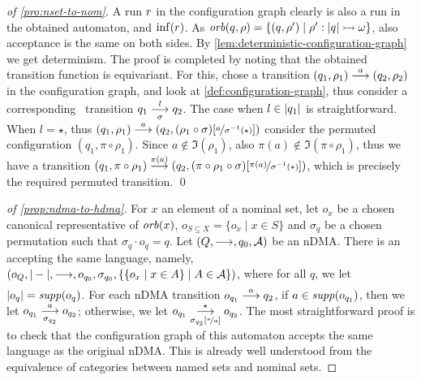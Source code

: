 \begin{proof}[of \cref{pro:nset-to-nom}]
 A run $r$ in the configuration graph clearly is also a run in the obtained automaton, and $\inf(r)$. As $\mathit{orb}(q,\rho) = \{(q,\rho')\mid \rho' : |q| \rightarrowtail \omega \}$, also acceptance is the same on both sides. By \cref{lem:deterministic-configuration-graph} we get determinism. The proof is completed by noting that the obtained transition function is equivariant. For this, chose a transition $(q_1,\rho_1) \overset{a}{\longrightarrow} (q_2,\rho_2)$ in the configuration graph, and look at \cref{def:configuration-graph}, thus consider a corresponding \hdma\ transition $q_1 \overset{l}{\underset{\sigma}{\longrightarrow}} q_2$. The case when $l \in |q_1|$ is straightforward. When $l=\star$, thus $(q_1,\rho_1) \overset{a}{\longrightarrow} (q_2,(\rho_1 \circ \sigma)[\nicefrac{a}{\sigma^{-1}(\star)}])$ consider the permuted configuration $(q_1,\pi\circ\rho_1)$. Since $a \notin \Im(\rho_1)$, also  $\pi(a) \notin \Im (\pi\circ\rho_1)$, thus we have a transition $(q_1,\pi\circ\rho_1)\overset{\pi(a)}{\longrightarrow}(q_2,(\pi \circ \rho_1\circ \sigma)[\nicefrac{\pi(a)}{\sigma^{-1}(*)}])$, which is precisely the required permuted transition. \qed
\end{proof}

 
\begin{proof}[of \cref{prop:ndma-to-hdma}]
For $x$ an element of a nominal set, let $o_x$ be a chosen canonical representative of $\mathit{orb}(x)$, $o_{S \subseteq X} = \{o_x \mid x \in S\}$ and $\sigma_q$ be a chosen permutation such that $\sigma_q \cdot o_q = q$.	Let $(Q,\overset{}{\longrightarrow},q_0,\mathcal{A})$ be an nDMA. There is an \hdma{} accepting the same language, namely,  $(o_Q,|-|,\overset{}{\underset{}{\longrightarrow}},o_{q_0},\sigma_{q_0},\{ \{ o_x \mid x \in A\} \mid A \in \mathcal{A} \})$, 
%
where for all $q$, we let $|o_q| = \mathit{supp}(o_q)$. For each nDMA transition $o_{q_1} \overset{a}{\longrightarrow} q_2$, if $a \in \mathit{supp}(o_{q_1})$, then we let $o_{q_1} \overset{a}{\underset{\sigma_{q_2}}{\longrightarrow}} o_{q_2}$; otherwise, we let $o_{q_1} \overset{\star}{\underset{\sigma_{q_2}[\nicefrac{*}{a}]}{\longrightarrow}} o_{q_2}$. The most straightforward proof is to check that the configuration graph of this automaton accepts the same language as the original nDMA. This is already well understood from the equivalence of categories between named sets and nominal sets.
\end{proof}


